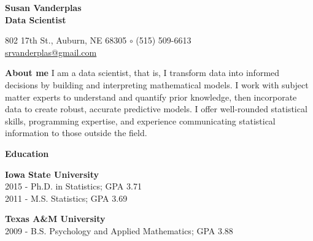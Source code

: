 \documentclass[letterpaper,12pt,final]{memoir}
\newcommand{\MedSep}{\vspace{1em}}
\newcommand{\SmallSep}{\vspace{0.5em}}
\newenvironment{AboutMe}
	{\ignorespaces\textbf{\color{RoyalBlue} About me}}
	{\MedSep\ignorespacesafterend}
\newcommand{\CVSection}[1]
	{\Large\textbf{#1}\par
	\SmallSep\normalsize\normalfont}
\newcommand{\CVItem}[1]
	{\textbf{\color{RoyalBlue} #1}}
\begin{document}



\begin{minipage}[t]{.5\linewidth}
\Huge\bfseries {\color{RoyalBlue} Susan Vanderplas} \\
\Large\bfseries  Data Scientist 
\end{minipage}\hfill
\begin{minipage}[t]{.5\linewidth}
\begin{flushright}\small
\phantom{\Huge SVP}
802 17th St., Auburn, NE 68305 $\circ$
(515) 509-6613\\
\url{srvanderplas@gmail.com} 
\end{flushright}
\end{minipage}

\normalsize\normalfont
\SmallSep
\begin{AboutMe}
I am a data scientist, that is, I transform data into informed decisions by building and interpreting mathematical models. 
I work with subject matter experts to understand and quantify prior knowledge, then incorporate data to create robust, accurate predictive models. 
I offer well-rounded statistical skills, programming expertise, and experience communicating statistical information to those outside the field. 
\end{AboutMe}

\CVSection{Education}
\begin{minipage}[t]{.45\linewidth}
\CVItem{Iowa State University}\\
2015 - Ph.D. in Statistics; GPA 3.71\\
2011 - M.S. Statistics; GPA 3.69
\end{minipage}
\begin{minipage}[t]{.55\linewidth}
\CVItem{Texas A\&M University}\\
2009 - B.S. Psychology and Applied Mathematics; GPA 3.88
\end{minipage}
\MedSep
\end{document}
